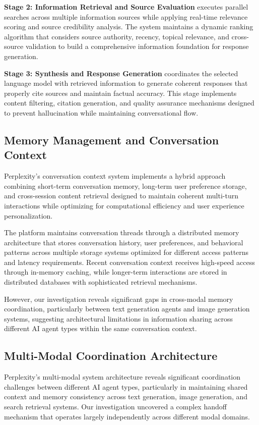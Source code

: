 \documentclass[12pt]{article}
\begin{document}
\textbf{Stage 2: Information Retrieval and Source Evaluation} executes parallel searches across multiple information sources while applying real-time relevance scoring and source credibility analysis. The system maintains a dynamic ranking algorithm that considers source authority, recency, topical relevance, and cross-source validation to build a comprehensive information foundation for response generation.

\textbf{Stage 3: Synthesis and Response Generation} coordinates the selected language model with retrieved information to generate coherent responses that properly cite sources and maintain factual accuracy. This stage implements content filtering, citation generation, and quality assurance mechanisms designed to prevent hallucination while maintaining conversational flow.

\subsection{Memory Management and Conversation Context}

Perplexity's conversation context system implements a hybrid approach combining short-term conversation memory, long-term user preference storage, and cross-session content retrieval designed to maintain coherent multi-turn interactions while optimizing for computational efficiency and user experience personalization.

The platform maintains conversation threads through a distributed memory architecture that stores conversation history, user preferences, and behavioral patterns across multiple storage systems optimized for different access patterns and latency requirements. Recent conversation context receives high-speed access through in-memory caching, while longer-term interactions are stored in distributed databases with sophisticated retrieval mechanisms.

However, our investigation reveals significant gaps in cross-modal memory coordination, particularly between text generation agents and image generation systems, suggesting architectural limitations in information sharing across different AI agent types within the same conversation context.

\subsection{Multi-Modal Coordination Architecture}

Perplexity's multi-modal system architecture reveals significant coordination challenges between different AI agent types, particularly in maintaining shared context and memory consistency across text generation, image generation, and search retrieval systems. Our investigation uncovered a complex handoff mechanism that operates largely independently across different modal domains.
\end{document}
